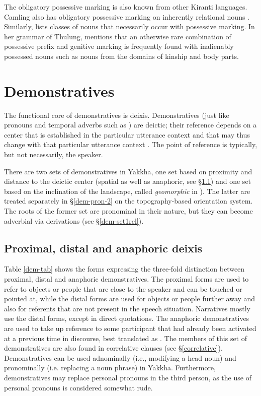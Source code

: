 The obligatory possessive marking is also known from other Kiranti languages. Camling also has obligatory possessive marking on inherently relational nouns \citep[41]{Ebert1997Camling}. Similarly, \citet[98-100]{Doornenbal2009A-grammar} lists  classes of nouns that necessarily occur with possessive marking. In her grammar of Thulung, \citet[72]{Lahaussois2002Thulung} mentions that an otherwise rare combination of possessive prefix and genitive marking is frequently found with inalienably possessed nouns such as nouns from the domains of kinship and body parts.




\section{Demonstratives} \label{dem-pron}

The functional core of demonstratives is deixis. Demonstratives (just like pronouns and temporal adverbs such as ) are deictic; their reference depends on a center that is established in the  particular utterance context and that may thus  change with that particular utterance context \citep{Buehler1934_Sprachtheorie, Fillmore1997_Deixis}. The point of reference is typically, but not necessarily, the speaker. 


There are two sets of demonstratives in Yakkha, one set based on proximity and distance to the deictic center (spatial as well as anaphoric, see §\ref{dem-pron-1}) and one set based on the inclination of the landscape, called \emph{geomorphic} in \citet{Bickel1997Spatial}). The latter are treated separately in §\ref{dem-pron-2} on the topography-based orientation system. The roots of the former set are pronominal in  their nature, but they can become adverbial via derivations (see §\ref{dem-set1rel}). 


\subsection{Proximal, distal and anaphoric deixis}\label{dem-pron-1}

Table \ref{dem-tab} shows the forms expressing the three-fold distinction between proximal, distal and anaphoric demonstratives. The proximal forms are used to refer to objects or people that are close to the speaker and can be touched or pointed at, while the distal forms are used for objects or people further away and also for referents that are not present in the speech situation. Narratives mostly use the distal forms, except in direct quotations. The anaphoric demonstratives are used to take up  reference to some participant that had  already been activated at a previous time in discourse, best translated as  . The members of this set of demonstratives are also found in correlative clauses (see §\ref{correlative}). Demonstratives can be used adnominally (i.e., modifying a head noun) and pronominally (i.e. replacing a noun phrase) in Yakkha. Furthermore, demonstratives may replace personal pronouns in the third person, as the use of personal pronouns is considered somewhat rude.


